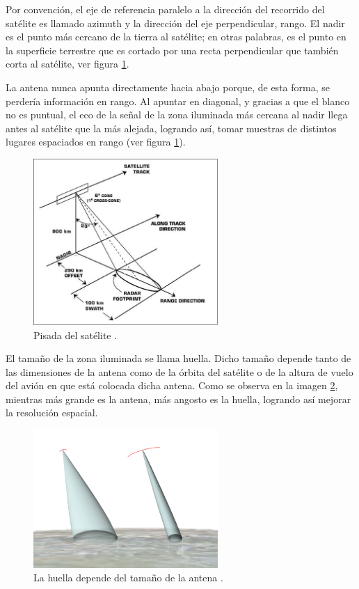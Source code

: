 Por convención, el eje de referencia paralelo a la dirección del recorrido del satélite es llamado azimuth y la
dirección del eje perpendicular, rango. El nadir es el punto más cercano de la tierra al satélite; en otras palabras,
es el punto en la superficie terrestre que es cortado por una recta perpendicular que también corta al satélite, ver figura \ref{fig:antenna_ilumination}.

La antena nunca apunta directamente hacia abajo porque, de esta forma, se perdería información en rango. Al apuntar
en diagonal, y gracias a que el blanco no es puntual, el eco de la señal de la zona iluminada más cercana al nadir llega
antes al satélite que la más alejada, logrando así, tomar muestras de distintos lugares espaciados en rango (ver figura
\ref{fig:antenna_ilumination}).

\begin{figure}[H]
 \centering
 \includegraphics[width=7cm]{gfx/satellite.png}
 \caption{Pisada del satélite \cite{FootprintSatellite}.}
 \label{fig:antenna_ilumination}
\end{figure}

El tamaño de la zona iluminada se llama huella. Dicho tamaño depende tanto de las dimensiones de la antena como de la
órbita del satélite o de la altura de vuelo del avión en que está colocada dicha antena. Como se observa en la imagen
\ref{fig:footprint}, mientras más grande es la antena, más angosto es la huella, logrando así mejorar la resolución
espacial.

\begin{figure}[H]
 \centering
 \includegraphics[width=7cm]{gfx/footprint.png}
 \caption{La huella depende del tamaño de la antena \cite{FootprintAntenna}.}
 \label{fig:footprint}
\end{figure}

